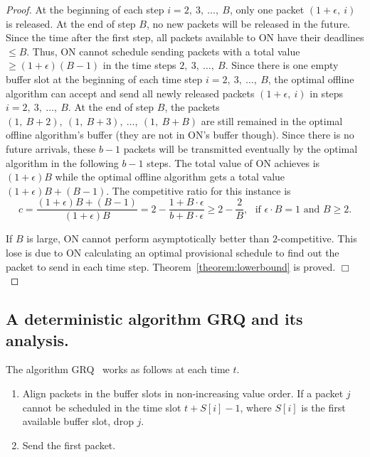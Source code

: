 \documentclass[final, 11pt]{article}
\begin{document}
\begin{proof}
At the beginning of each step $i = 2, \ 3, \ \ldots, \ B$, only one packet $(1 + \epsilon, \ i)$ is released. At the end of step $B$, no new packets will be released in the future. Since the time after the first step, all packets available to ON have their deadlines $\le B$. Thus, ON cannot schedule sending packets with a total value $\ge (1 + \epsilon)  (B - 1)$ in the time steps $2, \ 3, \ \ldots, \ B$. Since there is one empty buffer slot at the beginning of each time step $i = 2, \ 3, \ \ldots, \ B$, the optimal offline algorithm can accept and send all newly released packets $(1 + \epsilon, \ i)$ in steps $i = 2, \ 3, \ \ldots, \ B$. At the end of step $B$, the packets $(1, \ B + 2), \ (1, \ B + 3), \ \ldots, \ (1, \ B + B)$ are still remained in the optimal offline algorithm's buffer (they are not in ON's buffer though). Since there is no future arrivals, these $b - 1$ packets will be transmitted eventually by the optimal algorithm in the following $b - 1$ steps. The total value of ON achieves is $(1 + \epsilon) B$ while the optimal offline algorithm gets a total value $(1 + \epsilon)  B + (B - 1)$. The competitive ratio for this instance is
\begin{equation}
c = \frac{(1 + \epsilon) B + (B - 1)}{(1 + \epsilon) B} = 2 - \frac{1 + B \cdot \epsilon}{b + B \cdot \epsilon} \ge 2 - \frac{2}{B}, \ \ \ \mbox{if } \epsilon \cdot B = 1 \mbox{ and } B \ge 2.
\label{eq:change}
\end{equation}

If $B$ is large, ON cannot perform asymptotically better than $2$-competitive. This lose is due to ON calculating an optimal provisional schedule to find out the packet to send in each time step. Theorem~\ref{theorem:lowerbound} is proved. $\Box$
\end{proof}



\subsection{A deterministic algorithm GRQ and its analysis.}
\label{sec:me}

The algorithm GRQ~\cite{F09} works as follows at each time $t$.

\begin{enumerate}
\item Align packets in the buffer slots in non-increasing value order. If a packet $j$ cannot be scheduled in the time slot $t + S[i] - 1$, where $S[i]$ is the first available buffer slot, drop $j$.

\item Send the first packet.
\end{enumerate}
\end{document}
